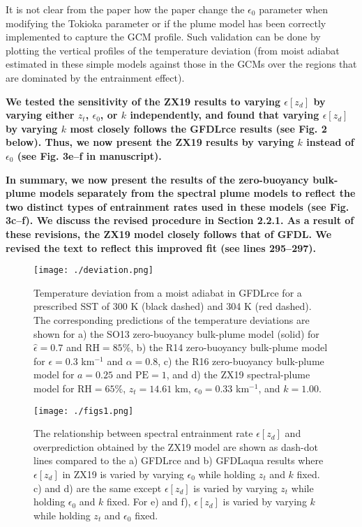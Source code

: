 \documentclass[11pt]{article}
\begin{document}
It is not clear from the paper how the paper change the \(\epsilon_0\) parameter when modifying the Tokioka parameter or if the plume model has been correctly implemented to capture the GCM profile. Such validation can be done by plotting the vertical profiles of the temperature deviation (from moist adiabat estimated in these simple models against those in the GCMs over the regions that are dominated by the entrainment effect).

\textbf{We tested the sensitivity of the ZX19 results to varying \(\epsilon[z_d]\) by varying either \(z_t\), \(\epsilon_0\), or \(k\) independently, and found that varying \(\epsilon[z_d]\) by varying \(k\) most closely follows the GFDLrce results (see Fig. 2 below). Thus, we now present the ZX19 results by varying \(k\) instead of \(\epsilon_0\) (see Fig. 3e--f in manuscript).}

\textbf{In summary, we now present the results of the zero-buoyancy bulk-plume models separately from the spectral plume models to reflect the two distinct types of entrainment rates used in these models (see Fig. 3c--f). We discuss the revised procedure in Section 2.2.1. As a result of these revisions, the ZX19 model closely follows that of GFDL. We revised the text to reflect this improved fit (see lines 295--297).}

\begin{figure}[htbp]
\centering
\texttt{[image: ./deviation.png]}
\caption{\label{fig:org081ec3f}Temperature deviation from a moist adiabat in GFDLrce for a prescribed SST of 300 K (black dashed) and 304 K (red dashed). The corresponding predictions of the temperature deviations are shown for a) the SO13 zero-buoyancy bulk-plume model (solid) for \(\hat{\epsilon}=0.7\) and \(\mathrm{RH}=85\%\), b) the R14 zero-buoyancy bulk-plume model for \(\epsilon=0.3\) km\(^{-1}\) and \(\alpha=0.8\), c) the R16 zero-buoyancy bulk-plume model for \(a=0.25\) and \(\mathrm{PE}=1\), and d) the ZX19 spectral-plume model for \(\mathrm{RH}=65\%\), \(z_t=14.61\) km, \(\epsilon_0=0.33\) km\(^{-1}\), and \(k=1.00\).}
\end{figure}

\begin{figure}[htbp]
\centering
\texttt{[image: ./figs1.png]}
\caption{\label{fig:orgf00720e}The relationship between spectral entrainment rate \(\epsilon[z_d]\) and overprediction obtained by the ZX19 model are shown as dash-dot lines compared to the a) GFDLrce and b) GFDLaqua results where \(\epsilon[z_d]\) in ZX19 is varied by varying \(\epsilon_0\) while holding \(z_t\) and \(k\) fixed. c) and d) are the same except \(\epsilon[z_d]\) is varied by varying \(z_t\) while holding \(\epsilon_0\) and \(k\) fixed. For e) and f), \(\epsilon[z_d]\) is varied by varying \(k\) while holding \(z_t\) and \(\epsilon_0\) fixed.}
\end{figure}



\end{document}
